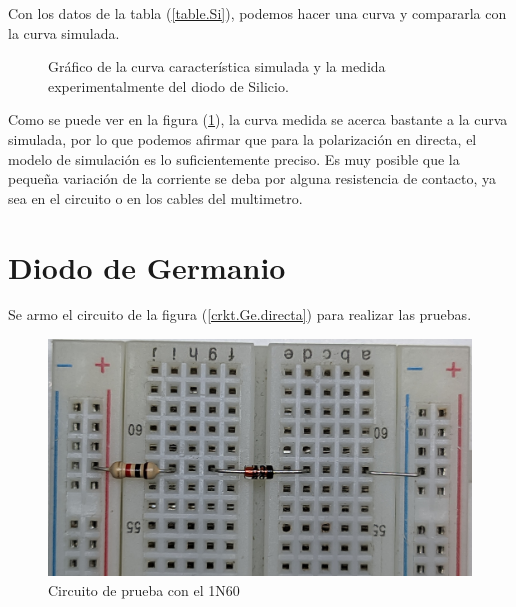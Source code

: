 \documentclass[chaptersright]{informeutn}
\begin{document}
      Con los datos de la tabla (\ref{table.Si}), podemos hacer una curva y compararla con la curva simulada.
      \begin{figure}[!ht]
        \centering
        \caption{Gráfico de la curva característica simulada y la medida experimentalmente del diodo de Silicio.}
        \label{graph.comparativa.Si}
      \end{figure}

      Como se puede ver en la figura (\ref{graph.comparativa.Si}), la curva medida se acerca bastante a la curva
      simulada, por lo que podemos afirmar que para la polarización en directa, el modelo de simulación es lo
      suficientemente preciso. Es muy posible que la pequeña variación de la corriente se deba por alguna resistencia
      de contacto, ya sea en el circuito o en los cables del multimetro.

    \section{Diodo de Germanio}
      Se armo el circuito de la figura (\ref{crkt.Ge.directa}) para realizar las pruebas.
      \begin{figure}[H]
        \centering
        \includegraphics[angle=180, width=.8\textwidth]{pictures/prot_crkt-2.jpg}
        \caption{Circuito de prueba con el 1N60}
        \label{crkt.Ge.prot}
      \end{figure}
\end{document}
